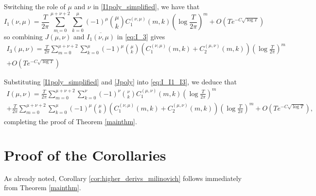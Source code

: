 \documentclass[12pt, a4paper,reqno]{amsart}
\theoremstyle{definition}
\numberwithin{equation}{section}
\begin{document}
Switching the role of $\mu$ and $\nu$ in \eqref{I1poly_simplified}, we have that
\begin{equation}\label{I1_reversepoly_simplified}
    I_1(\nu,\mu)=\frac{T}{2\pi} \sum_{m=0}^{\mu+\nu+2} \sum_{k=0}^{\mu} (-1)^{\mu} \binom{\mu}{k} C_1^{(\nu,\mu)}(m,k) \left(\log\frac{T}{2\pi}\right)^m + O\left(Te^{-C\sqrt{\log T}}\right)
\end{equation}
so combining $\overline{J(\mu,\nu)}$ and $\overline{I_1(\nu,\mu)}$ in \eqref{eq:I_3} gives
\begin{multline}\label{Jpoly}
    I_3(\mu,\nu)=\frac{T}{2\pi} \sum_{m=0}^{\mu+\nu+2} \sum_{k=0}^{\mu} (-1)^{\mu} \binom{\mu}{k} \left(C_1^{(\nu,\mu)}(m,k)+C_2^{(\mu,\nu)}(m,k)\right) \left(\log\frac{T}{2\pi}\right)^m\\
    +O\left(Te^{-C\sqrt{\log T}}\right)
\end{multline}

Substituting \eqref{I1poly_simplified} and \eqref{Jpoly} into \eqref{eq:I_I1_I3}, we deduce that
\begin{multline*}
    I(\mu,\nu)=\frac{T}{2\pi} \sum_{m=0}^{\mu+\nu+2} \sum_{k=0}^{\nu} (-1)^{\nu} \binom{\nu}{k} C_1^{(\mu,\nu)}(m,k) \left(\log\frac{T}{2\pi}\right)^m\\ 
    +\frac{T}{2\pi} \sum_{m=0}^{\mu+\nu+2} \sum_{k=0}^{\mu} (-1)^{\mu} \binom{\mu}{k}  \left(C_1^{(\nu,\mu)}(m,k)+C_2^{(\mu,\nu)}(m,k)\right) \left(\log\frac{T}{2\pi}\right)^m + O\left(Te^{-C\sqrt{\log T}}\right),
\end{multline*}
completing the proof of Theorem \ref{mainthm}.




\section{Proof of the Corollaries}\label{conclusion}

As already noted, Corollary \ref{cor:higher_derivs_milinovich} follows immediately from Theorem \ref{mainthm}.
\end{document}
